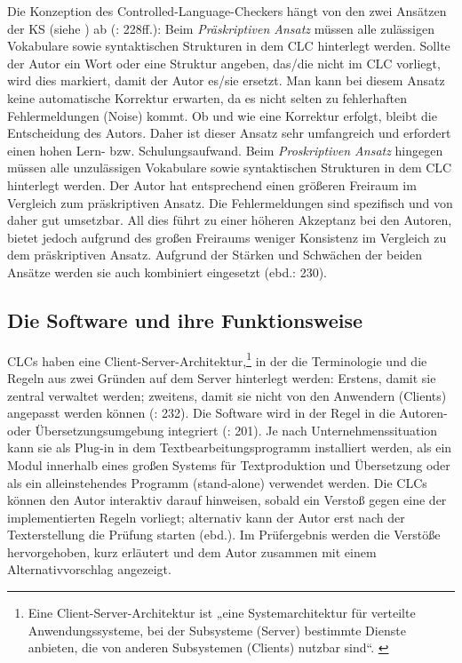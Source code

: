 Die Konzeption des Controlled-Language-Checkers hängt von den zwei Ansätzen der KS (siehe ) ab (\citealt{DrewerZiegler2014}: 228ff.): Beim \textit{Präskriptiven Ansatz}\textbf{ }müssen alle zulässigen Vokabulare sowie syntaktischen Strukturen in dem CLC hinterlegt werden. Sollte der Autor ein Wort oder eine Struktur angeben, das/die nicht im CLC vorliegt, wird dies markiert, damit der Autor es/sie ersetzt. Man kann bei diesem Ansatz keine automatische Korrektur erwarten, da es nicht selten zu fehlerhaften Fehlermeldungen (Noise) kommt. Ob und wie eine Korrektur erfolgt, bleibt die Entscheidung des Autors. Daher ist dieser Ansatz sehr umfangreich und erfordert einen hohen Lern- bzw. Schulungsaufwand. Beim \textit{Proskriptiven Ansatz} hingegen müssen alle unzulässigen Vokabulare sowie syntaktischen Strukturen in dem CLC hinterlegt werden. Der Autor hat entsprechend einen größeren Freiraum im Vergleich zum präskriptiven Ansatz. Die Fehlermeldungen sind spezifisch und von daher gut umsetzbar. All dies führt zu einer höheren Akzeptanz bei den Autoren, bietet jedoch aufgrund des großen Freiraums weniger Konsistenz im Vergleich zu dem präskriptiven Ansatz. Aufgrund der Stärken und Schwächen der beiden Ansätze werden sie auch kombiniert eingesetzt (ebd.: 230).

\subsection{Die Software und ihre Funktionsweise}

CLCs haben eine Client-Server-Architektur,\footnote{{{{Eine Client-Server-Architektur ist „eine Systemarchitektur für verteilte Anwendungssysteme, bei der Subsysteme (Server) bestimmte Dienste anbieten, die von anderen Subsystemen (Clients) nutzbar sind“. \citep{Fettke2016}}}}} in der die Terminologie und die Regeln aus zwei Gründen auf dem Server hinterlegt werden: Erstens, damit sie zentral verwaltet werden; zweitens, damit sie nicht von den Anwendern (Clients) angepasst werden können (\citealt{DrewerZiegler2014}: 232). Die Software wird in der Regel in die Autoren- oder Übersetzungsumgebung integriert (\citealt{DrewerSchmitz2017}: 201). Je nach Unternehmenssituation kann sie als Plug-in in dem Textbearbeitungsprogramm installiert werden, als ein Modul innerhalb eines großen Systems für Textproduktion und Übersetzung oder als ein alleinstehendes Programm (stand-alone) verwendet werden. Die CLCs können den Autor interaktiv darauf hinweisen, sobald ein Verstoß gegen eine der implementierten Regeln vorliegt; alternativ kann der Autor erst nach der Texterstellung die Prüfung starten (ebd.). Im Prüfergebnis werden die Verstöße hervorgehoben, kurz erläutert und dem Autor zusammen mit einem Alternativvorschlag angezeigt.

